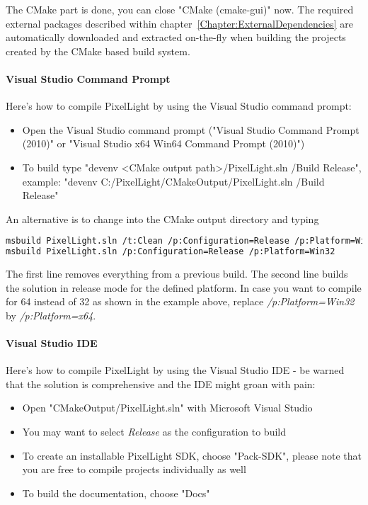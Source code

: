 The CMake part is done, you can close "CMake (cmake-gui)" now. The required external packages described within chapter~\ref{Chapter:ExternalDependencies} are automatically downloaded and extracted on-the-fly when building the projects created by the CMake based build system.


\paragraph{Visual Studio Command Prompt}
Here's how to compile PixelLight by using the Visual Studio command prompt:
\begin{itemize}
\item{Open the Visual Studio command prompt ("Visual Studio Command Prompt (2010)" or "Visual Studio x64 Win64 Command Prompt (2010)")}
\item{To build type "devenv <CMake output path>/PixelLight.sln /Build Release", example: "devenv C:/PixelLight/CMakeOutput/PixelLight.sln /Build Release"}
\end{itemize}

An alternative is to change into the CMake output directory and typing
\begin{lstlisting}[language=sh]
msbuild PixelLight.sln /t:Clean /p:Configuration=Release /p:Platform=Win32
msbuild PixelLight.sln /p:Configuration=Release /p:Platform=Win32
\end{lstlisting}
The first line removes everything from a previous build. The second line builds the solution in release mode for the defined platform. In case you want to compile for \SI{64}{\bit} instead of \SI{32}{\bit} as shown in the example above, replace \emph{/p:Platform=Win32} by \emph{/p:Platform=x64}.


\paragraph{Visual Studio \ac{IDE}}
Here's how to compile PixelLight by using the Visual Studio \ac{IDE} - be warned that the solution is comprehensive and the \ac{IDE} might groan with pain:
\begin{itemize}
\item{Open "CMakeOutput/PixelLight.sln" with Microsoft Visual Studio}
\item{You may want to select \emph{Release} as the configuration to build}
\item{To create an installable PixelLight \ac{SDK}, choose "Pack-SDK", please note that you are free to compile projects individually as well}
\item{To build the documentation, choose "Docs"}
\end{itemize}





